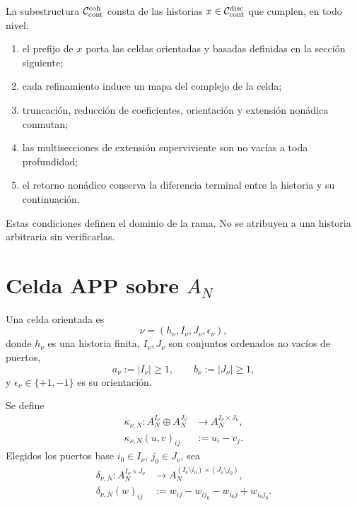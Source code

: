 La subestructura \(\mathcal C_{\rm cont}^{\rm coh}\) consta de las historias
\(x\in\mathcal C_{\rm cont}^{\rm disc}\) que cumplen, en todo nivel:
\begin{enumerate}
 \item el prefijo de \(x\) porta las celdas orientadas y basadas definidas en
       la sección siguiente;
 \item cada refinamiento induce un mapa del complejo de la celda;
 \item truncación, reducción de coeficientes, orientación y extensión
       nonádica conmutan;
 \item las multisecciones de extensión superviviente son no vacías a toda
       profundidad;
 \item el retorno nonádico conserva la diferencia terminal entre la historia
       y su continuación.
\end{enumerate}
Estas condiciones definen el dominio de la rama. No se atribuyen a una
historia arbitraria sin verificarlas.

\section{Celda APP sobre \texorpdfstring{\(A_N\)}{AN}}
\label{sec:pdfv2-coh-cell}

Una celda orientada es
\[
 \nu=(h_\nu,I_\nu,J_\nu,\epsilon_\nu),
\]
donde \(h_\nu\) es una historia finita, \(I_\nu,J_\nu\) son conjuntos
ordenados no vacíos de puertos,
\[
 a_\nu:=|I_\nu|\geq1,
 \qquad
 b_\nu:=|J_\nu|\geq1,
\]
y \(\epsilon_\nu\in\{+1,-1\}\) es su orientación.

Se define
\begin{equation}\label{eq:pdfv2-coh-kappa}
 \begin{aligned}
 \kappa_{\nu,N}:
 A_N^{I_\nu}\oplus A_N^{J_\nu}
 &\longrightarrow A_N^{I_\nu\times J_\nu},\\
 \kappa_{\nu,N}(u,v)_{ij}&:=u_i-v_j.
 \end{aligned}
\end{equation}
Elegidos los puertos base \(i_0\in I_\nu\), \(j_0\in J_\nu\), sea
\begin{equation}\label{eq:pdfv2-coh-delta}
 \begin{aligned}
 \delta_{\nu,N}:A_N^{I_\nu\times J_\nu}
 &\longrightarrow
 A_N^{(I_\nu\setminus i_0)\times(J_\nu\setminus j_0)},\\
 \delta_{\nu,N}(w)_{ij}
 &:={}
 w_{ij}-w_{i j_0}-w_{i_0j}+w_{i_0j_0}.
 \end{aligned}
\end{equation}


